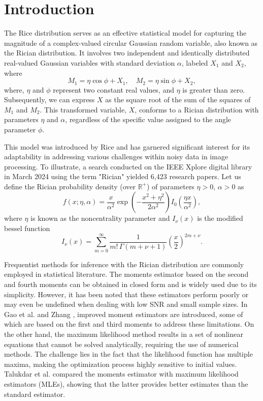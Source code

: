 \documentclass[12pt]{interact}
\theoremstyle{plain}%
\theoremstyle{definition}
\theoremstyle{remark}
\begin{document}
\section{Introduction}


The Rice distribution serves as an effective statistical model for capturing the magnitude of a complex-valued circular Gaussian random variable, also known as the Rician distribution. It involves two independent and identically distributed real-valued Gaussian variables with standard deviation $\alpha$, labeled $X_1$ and $X_2$, where
\begin{equation*}
M_1 = \eta \cos \phi + X_1, \quad
M_2 = \eta \sin \phi + X_2,
\end{equation*}
where, $\eta$ and $\phi$ represent two constant real values, and $\eta$ is greater than zero. Subsequently, we can express $X$ as the square root of the sum of the squares of $M_1$ and $M_2$. This transformed variable, $X$, conforms to a Rician distribution with parameters $\eta$ and $\alpha$, regardless of the specific value assigned to the angle parameter $\phi$.

This model was introduced by Rice \cite{rice1945mathematical} and has garnered significant interest for its adaptability in addressing various challenges within noisy data in image processing. To illustrate, a search conducted on the IEEE Xplore digital library in March 2024 using the term "Rician" yielded 6,423 research papers. Let us define the Rician probability density (over $\mathbb{R}^+$) of parameters $\eta > 0$, $\alpha > 0$ as
\begin{equation}\label{dens}
f(x ; \eta, \alpha) =
\frac{x}{\alpha^2} \exp\left( -\frac{x^2 + \eta^2}{2\alpha^2} \right) I_0\left( \frac{\eta x}{\alpha^2} \right),
\end{equation}
where $\eta$ is known as the noncentrality parameter and $I_{\nu }(x)$ is the modified bessel function
 \begin{equation}
I_{\nu }(x)=\sum _{m=0}^{\infty }{\frac {1}{m!\,\Gamma (m+\nu +1)}}\left({\frac {x}{2}}\right)^{2m+\nu } .
\end{equation}

Frequentist methods for inference with the Rician distribution are commonly employed in statistical literature. The moments estimator based on the second and fourth moments can be obtained in closed form and is widely used due to its simplicity. However, it has been noted that these estimators perform poorly or may even be undefined when dealing with low SNR and small sample sizes. In Gao et al. \cite{gao2010estimation} and Zhang \cite{zhang2019method}, improved moment estimators are introduced, some of which are based on the first and third moments to address these limitations. On the other hand, the maximum likelihood method results in a set of nonlinear equations that cannot be solved analytically, requiring the use of numerical methods. The challenge lies in the fact that the likelihood function has multiple maxima, making the optimization process highly sensitive to initial values. Talukdar et al. \cite{talukdar1991estimation} compared the moments estimator with maximum likelihood estimators (MLEs), showing that the latter provides better estimates than the standard estimator.
\end{document}
